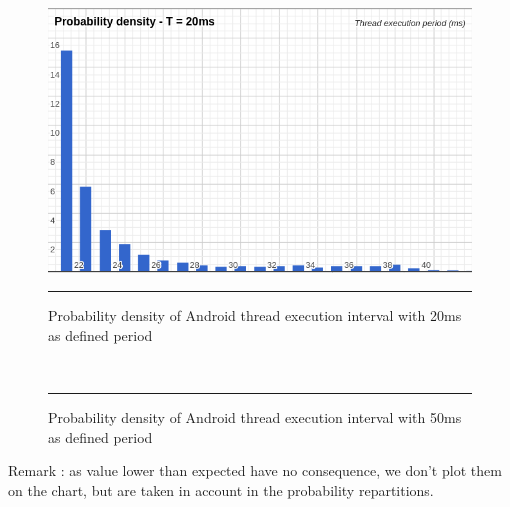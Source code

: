 \begin{figure}[h]
  \begin{minipage}[c]{.46\linewidth}
    \centering
 \includegraphics[width=\textwidth, height=.70\linewidth]{Pictures/dsp20.png}
    \label{fig:dsp20}
    \rule{16em}{0.5pt}
    \caption[Probability density of Android thread execution interval with 20ms as defined period]{Probability density of Android thread execution interval with 20ms as defined period}
  \end{minipage}
  \hfill%
  \begin{minipage}[c]{.46\linewidth}
    \
    \rule{16em}{0.5pt}
    \caption[Probability density of Android thread execution interval with 50ms as defined period]{Probability density of Android thread execution interval with 50ms as defined period}
  \end{minipage}
  
\end{figure}
\begin{center}
Remark : as value lower than expected have no consequence, we don't plot them on the chart, but are taken in account in the probability repartitions.
\end{center}

